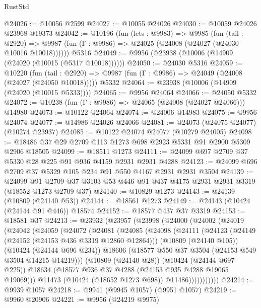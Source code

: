 \begin{lexlean}{RustStd}
\begin{coremodule}
@24026 := @10056 @2599
@24027 := @10055 @24026
@24030 := @10059 @24026 @23968 @19373
@24042 := @10196
    (fun (lets : @9983) =>
    @9985
      (fun (tail : @2920) =>
      @9987 (fun (Γ : @9986) => @24025 (@24008 (@24027 (@24030 @10016 @10018))))))
    @5316
@24049 := @9956 (@23938 (@10006 (@14909 (@24020 (@10015 (@5317 @10018))))))
@24050 := @24030 @5316
@24059 := @10220
    (fun (tail : @2920) => @9987 (fun (Γ : @9986) => @24049 (@24008 (@24027 (@24050 @10018)))))
    @5332
@24064 := @23938 (@10006 (@14909 (@24020 (@10015 @5333))))
@24065 := @9956 @24064
@24066 := @24050 @5332
@24072 := @10238 (fun (Γ : @9986) => @24065 (@24008 (@24027 @24066))) @14980
@24073 := @10122 @24064
@24074 := @24006 @14983
@24075 := @9956 @24074
@24077 := @14986 @24026 @24066
@24081 := @24073 (@24075 @24077) (@10274 @23937)
@24085 := @10122 @24074 @24077 (@10279 @24005)
@24098 := @18486 @37 @29 @2709 @113 @1273 @698 @2923 @5331 @91 @2900 @5309 @2906 @18505
@24099 := @18511 @1273
@24111 := @24099 @697 @2709 @37 @5330 @28 @225 @91 @936 @4159 @2931 @2931 @4288
@24123 := @24099 @696 @2709 @37 @5329 @105 @234 @91 @550 @4167 @2931 @2931 @3504
@24139 := @24099
    @91
    @2709
    @37
    @3103
    @53
    @446
    @91
    @437
    @4175
    @2931
    @2931
    @3319
    (@18552 @1273 @2709 @37)
@24140 := @10829 @1273
@24143 := @24139 (@10809 (@24140 @53))
@24144 := @18561 @1273
@24149 := @24143 (@10424 (@24144 @91 @446)) @18574
@24152 := @18577 @437 @37 @3319
@24153 := @18581 @37
@24213 := @23932
    (@23957
      (@23998
        (@24000
          (@24002
            (@24019
              (@24042
                (@24059
                  (@24072
                    (@24081
                      (@24085
                        (@24098
                          (@24111
                            (@24123
                              (@24149 (@24152 (@24153 @436 @3319 @12860 @12864)))
                              (@10809 (@24140 @105))
                              (@10424 (@24144 @696 @234))
                              @18606
                              (@18577 @550 @37 @3504 (@24153 @549 @3504 @14215 @14219)))
                            (@10809 (@24140 @28))
                            (@10424 (@24144 @697 @225))
                            @18634
                            (@18577 @936 @37 @4288 (@24153 @935 @4288 @19065 @19069)))
                          @11473
                          (@10424 (@18652 @1273 @698))
                          @11486)))))))))))
@24214 := @9939 @1057
@24218 := @9941 (@9945 @1057) (@9951 @1057)
@24219 := @9960 @20906
@24221 := @9956 (@24219 @9975)

\end{coremodule}
\end{lexlean}
